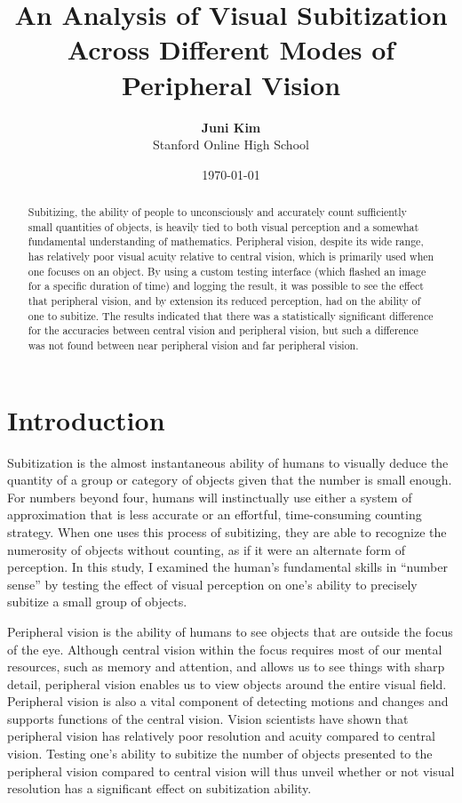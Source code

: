 \documentclass[12pt]{article}
\title{An Analysis of Visual Subitization Across Different Modes of Peripheral
Vision}
\author{\textbf{Juni Kim} \\
Stanford Online High School}
\date{\today}
\begin{document}
 

\maketitle

\begin{abstract}

Subitizing, the ability of people to unconsciously and accurately count
sufficiently small quantities of objects, is heavily tied to both visual
perception and a somewhat fundamental understanding of mathematics.
Peripheral vision, despite its wide range, has relatively poor visual
acuity relative to central vision, which is primarily used when one focuses
on an object. By using a custom testing interface (which flashed an image
for a specific duration of time) and logging the result, it was possible to
see the effect that peripheral vision, and by extension its reduced
perception, had on the ability of one to subitize. The results indicated
that there was a statistically significant difference for the accuracies
between central vision and peripheral vision, but such a difference was not
found between near peripheral vision and far peripheral vision.

\end{abstract}


\section{Introduction}

Subitization is the almost instantaneous ability of humans to visually deduce
the quantity of a group or category of objects given that the number is small
enough. For numbers beyond four, humans will instinctually use either a
system of approximation that is less accurate or an effortful, time-consuming
counting strategy. When one uses this process of subitizing, they are able to
recognize the numerosity of objects without counting, as if it were an
alternate form of perception.  In this study, I examined the human’s
fundamental skills in “number sense” by testing the effect of visual perception
on one’s ability to precisely subitize a small group of objects. 

Peripheral vision is the ability of humans to see objects that are outside the
focus of the eye. Although central vision within the focus requires most of our
mental resources, such as memory and attention, and allows us to see things
with sharp detail, peripheral vision enables us to view objects around the
entire visual field. Peripheral vision is also a vital component of detecting
motions and changes and supports functions of the central vision. Vision
scientists have shown that peripheral vision has relatively poor resolution and
acuity compared to central vision. Testing one’s ability to subitize the number
of objects presented to the peripheral vision compared to central vision will
thus unveil whether or not visual resolution has a significant effect on
subitization ability.
\end{document}
